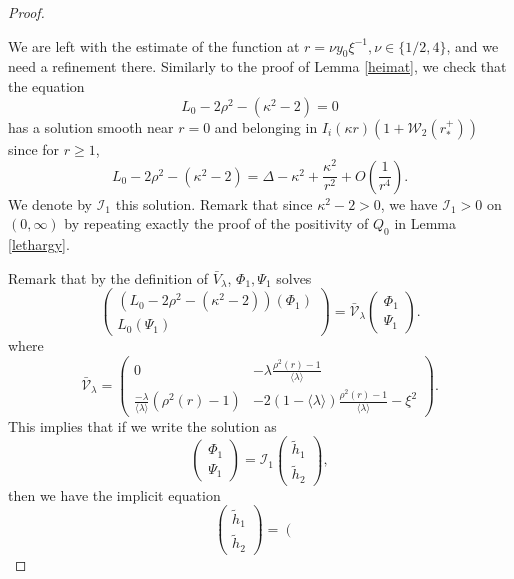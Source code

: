 \documentclass[11 pt]{amsart}
\theoremstyle{definition}
\theoremstyle{remark}
\numberwithin{equation}{section}
\begin{document}
\begin{proof}
  \
  
  We are left with the estimate of the function at $r = \nu y_0 \xi^{- 1}, \nu
  \in \{ 1/2, 4 \}$, and we need a refinement there.
  Similarly to the proof of Lemma \ref{heimat}, we check that the equation
  \[ L_0 - 2 \rho^2 - (\kappa^2 - 2) = 0 \]
  has a solution smooth near $r=0$ and belonging in $I_i (\kappa r) (1
  +\mathcal{W}_2 (r_\ast^+))$ since for $r \geqslant 1$,
  \[ L_0 - 2 \rho^2 - (\kappa^2 - 2) = \Delta - \kappa^2 +
     \frac{\kappa^2}{r^2} + O \left( \frac{1}{r^4} \right) . \]
  We denote by $\mathcal{I}_1$ this solution. Remark that since $\kappa^2-2>0$, we have $\mathcal{I}_1>0$ on $(0,\infty)$ by repeating exactly the proof of the positivity of $Q_0$ in Lemma \ref{lethargy}.
  
  Remark that by the definition of
  $\bar{V}_{\lambda}$, $\Phi_1, \Psi_1$ solves
  \[ \left(\begin{array}{c}
       (L_0 - 2 \rho^2 - (\kappa^2 - 2)) (\Phi_1)\\
       L_0 (\Psi_1)
     \end{array}\right) = \bar{\mathcal{V}}_{\lambda} \left(\begin{array}{c}
       \Phi_1\\
       \Psi_1
     \end{array}\right) . \]
  where
  \[ \bar{\mathcal{V}}_{\lambda} = \left(\begin{array}{cc}
       0 & - \lambda \frac{\rho^2 (r) - 1}{\langle \lambda \rangle}\\
       \frac{- \lambda}{\langle \lambda \rangle} (\rho^2 (r) - 1) & - 2 (1 -
       \langle \lambda \rangle) \frac{\rho^2 (r) - 1}{\langle \lambda \rangle}
       - \xi^2
     \end{array}\right) . \]
  This implies that if we write the solution as
  \[ \left(\begin{array}{c}
       \Phi_1\\
       \Psi_1
     \end{array}\right) =\mathcal{I}_1 \left(\begin{array}{c}
       \widetilde{h}_1\\
       \widetilde{h}_2
     \end{array}\right), \]
  then we have the implicit equation
  \[ \left(\begin{array}{c}
       \widetilde{h}_1\\
       \widetilde{h}_2
     \end{array}\right) = \left(\begin{array}{c}

\end{array}\]
\end{proof}
\end{document}
